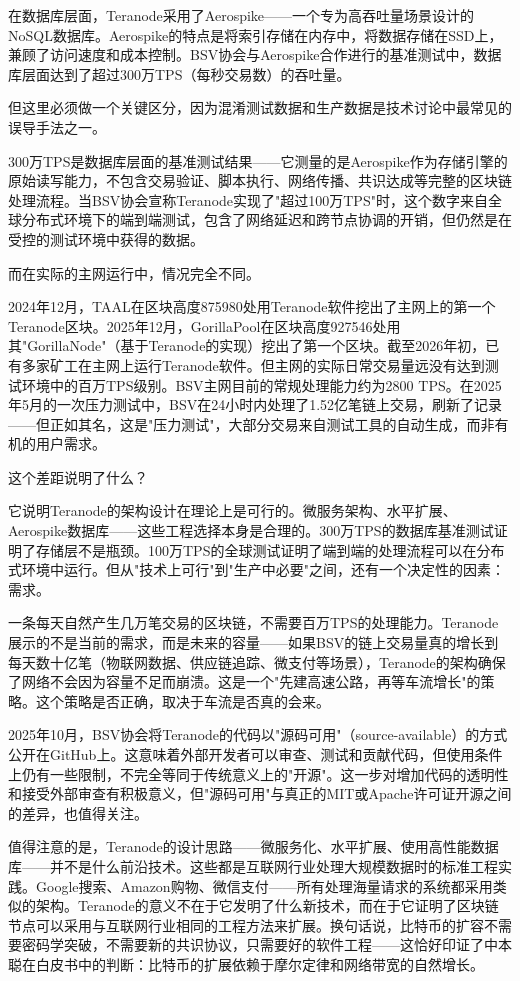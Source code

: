 \documentclass[a4paper,12pt,openany]{ctexbook}
\begin{document}
在数据库层面，Teranode采用了Aerospike——一个专为高吞吐量场景设计的NoSQL数据库。Aerospike的特点是将索引存储在内存中，将数据存储在SSD上，兼顾了访问速度和成本控制。BSV协会与Aerospike合作进行的基准测试中，数据库层面达到了超过300万TPS（每秒交易数）的吞吐量。

但这里必须做一个关键区分，因为混淆测试数据和生产数据是技术讨论中最常见的误导手法之一。

300万TPS是数据库层面的基准测试结果——它测量的是Aerospike作为存储引擎的原始读写能力，不包含交易验证、脚本执行、网络传播、共识达成等完整的区块链处理流程。当BSV协会宣称Teranode实现了"超过100万TPS"时，这个数字来自全球分布式环境下的端到端测试，包含了网络延迟和跨节点协调的开销，但仍然是在受控的测试环境中获得的数据。

而在实际的主网运行中，情况完全不同。

2024年12月，TAAL在区块高度875980处用Teranode软件挖出了主网上的第一个Teranode区块。2025年12月，GorillaPool在区块高度927546处用其"GorillaNode"（基于Teranode的实现）挖出了第一个区块。截至2026年初，已有多家矿工在主网上运行Teranode软件。但主网的实际日常交易量远没有达到测试环境中的百万TPS级别。BSV主网目前的常规处理能力约为2800 TPS。在2025年5月的一次压力测试中，BSV在24小时内处理了1.52亿笔链上交易，刷新了记录——但正如其名，这是"压力测试"，大部分交易来自测试工具的自动生成，而非有机的用户需求。

这个差距说明了什么？

它说明Teranode的架构设计在理论上是可行的。微服务架构、水平扩展、Aerospike数据库——这些工程选择本身是合理的。300万TPS的数据库基准测试证明了存储层不是瓶颈。100万TPS的全球测试证明了端到端的处理流程可以在分布式环境中运行。但从"技术上可行"到"生产中必要"之间，还有一个决定性的因素：需求。

一条每天自然产生几万笔交易的区块链，不需要百万TPS的处理能力。Teranode展示的不是当前的需求，而是未来的容量——如果BSV的链上交易量真的增长到每天数十亿笔（物联网数据、供应链追踪、微支付等场景），Teranode的架构确保了网络不会因为容量不足而崩溃。这是一个"先建高速公路，再等车流增长"的策略。这个策略是否正确，取决于车流是否真的会来。

2025年10月，BSV协会将Teranode的代码以"源码可用"（source-available）的方式公开在GitHub上。这意味着外部开发者可以审查、测试和贡献代码，但使用条件上仍有一些限制，不完全等同于传统意义上的"开源"。这一步对增加代码的透明性和接受外部审查有积极意义，但"源码可用"与真正的MIT或Apache许可证开源之间的差异，也值得关注。

值得注意的是，Teranode的设计思路——微服务化、水平扩展、使用高性能数据库——并不是什么前沿技术。这些都是互联网行业处理大规模数据时的标准工程实践。Google搜索、Amazon购物、微信支付——所有处理海量请求的系统都采用类似的架构。Teranode的意义不在于它发明了什么新技术，而在于它证明了区块链节点可以采用与互联网行业相同的工程方法来扩展。换句话说，比特币的扩容不需要密码学突破，不需要新的共识协议，只需要好的软件工程——这恰好印证了中本聪在白皮书中的判断：比特币的扩展依赖于摩尔定律和网络带宽的自然增长。
\end{document}
